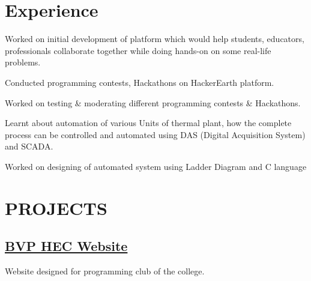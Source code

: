 \documentclass[]{deedy-resume-openfont}
\begin{document}
\begin{minipage}[t]{0.67\textwidth} 

\section{Experience}

\vspace{\topsep} %
\begin{tightemize}
\item   Worked on initial development of platform which would help students, educators, professionals collaborate together while doing hands-on on some real-life problems.
\end{tightemize}
\sectionsep

\begin{tightemize}
\item Conducted programming contests, Hackathons on HackerEarth platform.
\item Worked on testing \& moderating different programming contests \& Hackathons.
\end{tightemize}
\sectionsep

\begin{tightemize}
\item Learnt about automation of various Units of thermal plant, how the complete process can be controlled and automated using DAS (Digital Acquisition System) and SCADA.
\item Worked on designing of automated system using Ladder Diagram and C language               

\end{tightemize}
\sectionsep


\section{PROJECTS}
\subsection{\href{https://github.com/hackerearthclub/hackerearthclub.github.io}{BVP HEC Website}}
\vspace{\topsep} %
\begin{tightemize}
\item Website designed for programming club of the college.
\end{tightemize}
\sectionsep

\end{minipage}
\end{document}
